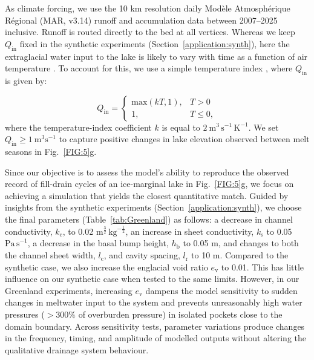 \documentclass[tc, manuscript]{copernicus}
\begin{document}
As climate forcing, we use the 10 km resolution daily Modèle Atmosphérique Régional (MAR, v3.14) runoff and accumulation data \citep{fettweis2017reconstructions} between 2007--2025 inclusive. Runoff is routed directly to the bed at all vertices. Whereas we keep $Q_{\mathrm{in}}$ fixed in the synthetic experiments (Section~\ref{application:synth}), here the extraglacial water input to the lake is likely to vary with time as a function of air temperature \citep{ng2007climatic,ng2009temporal}. To account for this, we use a simple temperature index \citep[as in][]{kingslake2015chaotic}, where $Q_{\mathrm{in}}$ is given by: 


\begin{equation}
\label{eq:Tempindex}
Q_{\mathrm{in}} =
\begin{cases}
\mathrm{max}(kT,1), & T > 0 \\
1, & T \le 0,
\end{cases}
\end{equation}
\noindent
where the temperature-index coefficient $ k $ is equal to $2\ \mathrm{m}^{3}\, \mathrm{s}^{-1}\, \mathrm{K}^{-1}$. We set $Q_{\mathrm{in}} \geq 1 \ \mathrm{m}^{3}\mathrm{s}^{-1}$ to capture positive changes in lake elevation observed between melt seasons in Fig.~\ref{FIG:5}g. 

Since our objective is to assess the model's ability to reproduce the observed record of fill-drain cycles of an ice-marginal lake in Fig.~\ref{FIG:5}g, we focus on achieving a simulation that yields the closest quantitative match. Guided by insights from the synthetic experiments (Section~\ref{application:synth}), we choose the final parameters (Table~\ref{tab:Greenland}) as follows: a decrease in channel conductivity, $k_{\mathrm{c}}$, to 0.02 $\mathrm{m}^{\frac{3}{2}}\, \mathrm{kg}^{-\frac{1}{2}}$, an increase in sheet conductivity, $k_{\mathrm{s}}$ to 0.05 $\mathrm{Pa\, s}^{-1}$, a decrease in the basal bump height, $h_{\mathrm{b}}$ to 0.05 m, and changes to both the channel sheet width, $l_{\mathrm{c}}$, and cavity spacing, $l_{\mathrm{r}}$ to 10 m. Compared to the synthetic case, we also increase the englacial void ratio $e_{\mathrm{v}}$ to 0.01. This has little influence on our synthetic case when tested to the same limits. However, in our Greenland experiments, increasing $e_{\mathrm{v}}$ dampens the model sensitivity to sudden changes in meltwater input to the system and prevents unreasonably high water pressures ($>300\%$ of overburden pressure) in isolated pockets close to the domain boundary. Across sensitivity tests, parameter variations produce changes in the frequency, timing, and amplitude of modelled outputs without altering the qualitative drainage system behaviour. 
\end{document}
